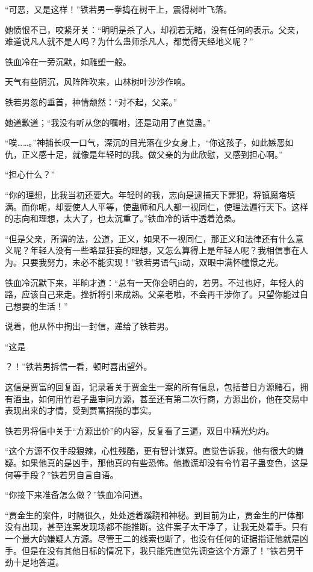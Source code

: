 \begin{this_body}
“可恶，又是这样！”铁若男一拳捣在树干上，震得树叶飞落。

她愤恨不已，咬紧牙关：“明明是杀了人，却视若无睹，没有任何的表示。父亲，难道说凡人就不是人吗？为什么蛊师杀凡人，都觉得天经地义呢？”

铁血冷在一旁沉默，如雕塑一般。

天气有些阴沉，风阵阵吹来，山林树叶沙沙作响。

铁若男忽的垂首，神情颓然：“对不起，父亲。”

她道歉道；“我没有听从您的嘱咐，还是动用了直觉蛊。”

“唉……。”神捕长叹一口气，深沉的目光落在少女身上，“你这孩子，如此嫉恶如仇，正义感十足，就像是年轻时的我。做父亲的为此欣慰，又感到担心啊。”

“担心什么？”

“你的理想，比我当初还要大。年轻时的我，志向是逮捕天下罪犯，将镇魔塔填满。而你呢，却要使人人平等，使蛊师和凡人都一视同仁，使理法遍行天下。这样的志向和理想，太大了，也太沉重了。”铁血冷的话中透着沧桑。

“但是父亲，所谓的法，公道，正义，如果不一视同仁，那正义和法律还有什么意义呢？年轻人没有一些略显狂妄的理想，又怎么算得上是年轻人呢？我相信事在人为。只要我努力，未必不能实现！”铁若男语气ji动，双眼中满怀幢憬之光。

铁血冷沉默下来，半晌才道：“总有一天你会明白的，若男。不过也好，年轻人的路，应该自己来走。挫折将引来成熟。父亲老啦，不会再干涉你了。只望你能过自己想要的生活！”

说着，他从怀中掏出一封信，递给了铁若男。

“这是

？！”铁若男拆信一看，顿时喜出望外。

这信是贾富的回复函，记录着关于贾金生一案的所有信息，包括昔日方源赌石，拥有酒虫，如何用竹君子蛊审问方源，甚至还有第二次行商，方源出价，他在交易中表现出来的才情，受到贾富招揽的事实。

铁若男将信中关于“方源出价”的内容，反复看了三遍，双目中精光灼灼。

“这个方源不仅手段狠辣，心性残酷，更有智计谋算。直觉告诉我，他有很大的嫌疑。如果他真的是凶手，那他真的有些恐怖。他撒谎却没有令竹君子蛊变色，这是何等手段？”铁若男自言自语。

“你接下来准备怎么做？”铁血冷问道。

“贾金生的案件，时隔很久，处处透着蹊跷和神秘。到目前为止，贾金生的尸体都没有出现，甚至连案发现场都不能推断。这件案子太干净了，让我无处着手。只有一个最大的嫌疑人方源。尽管王二的线索也断了，也没有任何的证据指证他就是凶手。但是在没有其他目标的情况下，我只能凭直觉先调查这个方源了！”铁若男干劲十足地答道。


\end{this_body}
